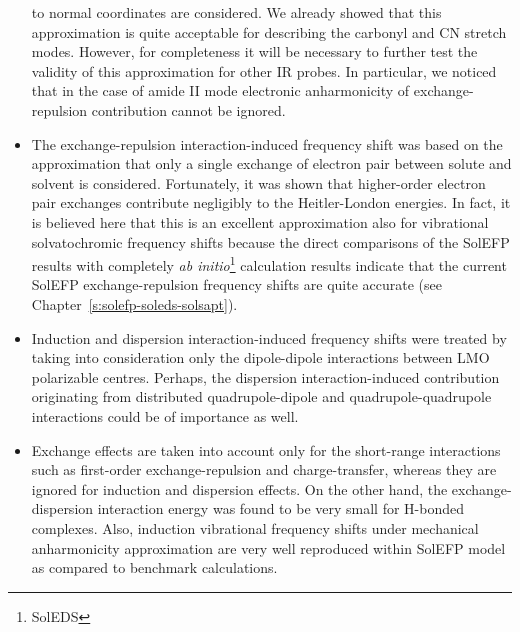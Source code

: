 \documentclass[b5paper,oneside,fleqn,11pt]{book}
\begin{document}
\begin{refsection}
\begin{itemize}
to normal coordinates are considered. We already showed that this approximation is quite acceptable 
for describing the carbonyl and CN stretch modes. \citep{Blasiak.Cho.JCP.2014,Blasiak.Cho.JCP.2015,
Blasiak.Ritchie.Webb.Cho.PCCP.2016}
However, for completeness it will be necessary to further test the validity of this approximation 
for other IR probes. In particular, we noticed that in the case of amide II mode
electronic anharmonicity of exchange\hyp{}repulsion contribution cannot be ignored. \citep{Blasiak.Cho.JCP.2015}
 \item The exchange\hyp{}repulsion interaction\hyp{}induced frequency shift was based on the approximation 
that only a single exchange of electron pair between solute and solvent is considered. 
Fortunately, it was shown that higher\hyp{}order electron pair exchanges contribute
negligibly to the Heitler\hyp{}London energies. \citep{Korona.Williams.Bukowski.Jeziorski.Szalewicz.JCP.1997}
In fact, it is believed here that this is an excellent approximation also for vibrational
solvatochromic frequency shifts because the direct comparisons 
of the SolEFP results with completely \emph{ab initio}\footnote{SolEDS} calculation results indicate 
that the current SolEFP exchange\hyp{}repulsion frequency shifts are quite accurate (see
Chapter~\ref{s:solefp-soleds-solsapt}). %
 \item Induction and dispersion interaction\hyp{}induced frequency shifts 
were treated by taking into consideration only the dipole\hyp{}dipole interactions 
between LMO polarizable centres. Perhaps, the dispersion interaction\hyp{}induced 
contribution originating from distributed quadrupole\hyp{}dipole and quadrupole\hyp{}quadrupole 
interactions could be of importance as well.
 \item Exchange effects are taken into account only for the short\hyp{}range
interactions such as first\hyp{}order exchange\hyp{}repulsion and charge\hyp{}transfer, whereas 
they are ignored for induction and dispersion effects. On the other hand,
the exchange\hyp{}dispersion interaction energy was found to be very small
for H-bonded complexes. \citep{Langlet.Caillet.Caffarel.JCP.1995,
Zierkiewicz.Jurecka.Hobza.ChemPhysChem.2005,Cybulski.Sadlej.JCTC.2008} 
Also, induction vibrational frequency shifts
under mechanical anharmonicity approximation
are very well reproduced within SolEFP model as compared to benchmark 
calculations. \citep{Blasiak.Cho.JCP.2014,Blasiak.Cho.JCP.2015,
Blasiak.Ritchie.Webb.Cho.PCCP.2016,Maj.Ahn.Blasiak.Kwak.Han.Cho.XXX.2016}

\end{itemize}
\end{refsection}
\end{document}
